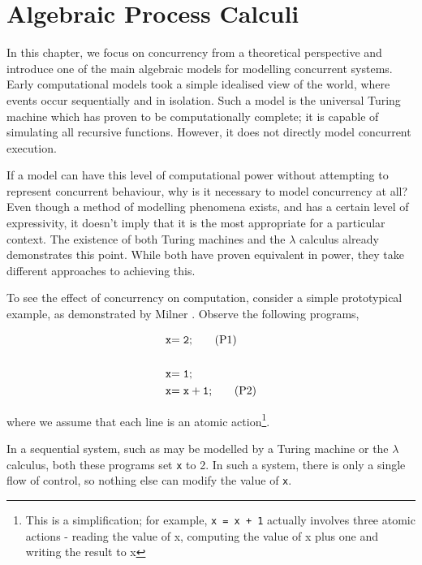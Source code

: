 
\chapter{Algebraic Process Calculi}
\label{apc}

In this chapter, we focus on concurrency from a theoretical
perspective and introduce one of the main algebraic models for
modelling concurrent systems.  Early computational models took a
simple idealised view of the world, where events occur sequentially
and in isolation.  Such a model is the universal Turing machine
\cite{turing:36} which has proven to be computationally complete; it
is capable of simulating all recursive functions.  However, it does
not directly model concurrent execution.

If a model can have this level of computational power without
attempting to represent concurrent behaviour, why is it necessary to
model concurrency at all?  Even though a method of modelling phenomena
exists, and has a certain level of expressivity, it doesn't imply that
it is the most appropriate for a particular context.  The existence of
both Turing machines and the $\lambda$ calculus already demonstrates
this point.  While both have proven equivalent in power, they take
different approaches to achieving this.

To see the effect of concurrency on computation, consider a simple
prototypical example, as demonstrated by Milner \cite{milner:lecture}.
Observe the following programs,

\begin{align*}
\mathtt{x} & \mathtt{= 2;}\tag{P1} \\
\\
\mathtt{x} & \mathtt{= 1;}\notag \\
\mathtt{x} & \mathtt{= x + 1;}\tag{P2}
\end{align*}

\noindent where we assume that each line is an atomic
action\footnote{This is a simplification; for example, \texttt{x = x +
    1} actually involves three atomic actions - reading the value of
  x, computing the value of x plus one and writing the result to x}.

In a sequential system, such as may be modelled by a Turing machine or the
$\lambda$ calculus, both these programs set \texttt{x} to 2.  In such a
system, there is only a single flow of control, so nothing else can
modify the value of \texttt{x}.

